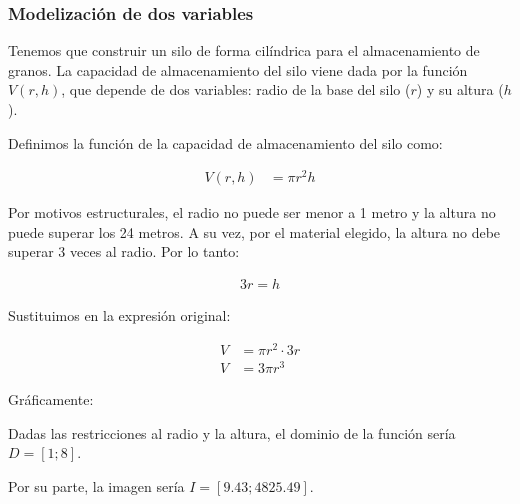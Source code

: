 \subsubsection*{Modelización de dos variables}

Tenemos que construir un silo de forma cilíndrica para el almacenamiento de granos. La capacidad de almacenamiento del silo viene dada por la función $V(r, h)$, que depende de dos variables: radio de la base del silo ($r$) y su altura ($h$).

\begin{center}
\end{center}

Definimos la función de la capacidad de almacenamiento del silo como:

\begin{align*}
    V(r, h) & = \pi r^2h
\end{align*}

Por motivos estructurales, el radio no puede ser menor a 1 metro y la altura no puede superar los 24 metros. 
A su vez, 
por el material elegido, 
la altura no debe superar 3 veces al radio. 
Por lo tanto:

\begin{align*}
    3r = h
\end{align*}

Sustituimos en la expresión original:

\begin{align*}
    V & = \pi r^2 \cdot 3r \\
    V & = 3 \pi r^3
\end{align*}

Gráficamente:

\begin{center}
\end{center}

Dadas las restricciones al radio y la altura, el dominio de la función sería $D = [1; 8]$.

Por su parte, la imagen sería $I = [9.43; 4825.49]$.
